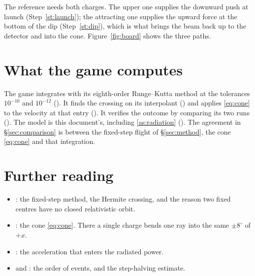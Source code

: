 \documentclass{leveldoc}
\begin{document}
The reference needs both charges. The upper one supplies the downward push at launch
(Step~\ref{st:launch}); the attracting one supplies the upward force at the bottom of the
dip (Step~\ref{st:dip}), which is what brings the beam back up to the detector and into
the cone. Figure~\ref{fig:board} shows the three paths.

\section{What the game computes}\label{sec:engine}

The game integrates  with its eighth-order Runge--Kutta method
at the tolerances $10^{-10}$ and $10^{-12}$ (). It finds the crossing on its
interpolant () and applies \eqref{eq:cone} to the velocity at that entry
(). It verifies the outcome by comparing its two runs (). The
model is this document's, including \ref{as:radiation} (). The agreement in
§\ref{sec:comparison} is between the fixed-step flight of §\ref{sec:method}, the cone
\eqref{eq:cone} and that integration.

\section{Further reading}\label{sec:reading}

\begin{itemize}
  \item {}: the fixed-step method, the Hermite crossing, and the reason
    two fixed centres have no closed relativistic orbit.
  \item {}: the cone \eqref{eq:cone}. There a single charge bends one
    ray into the same $\pm 8^\circ$ of $+x$.
  \item {}: the acceleration that enters the radiated power.
  \item {} and : the
    order of events, and the step-halving estimate.
\end{itemize}

\levelfileappendix
\end{document}
